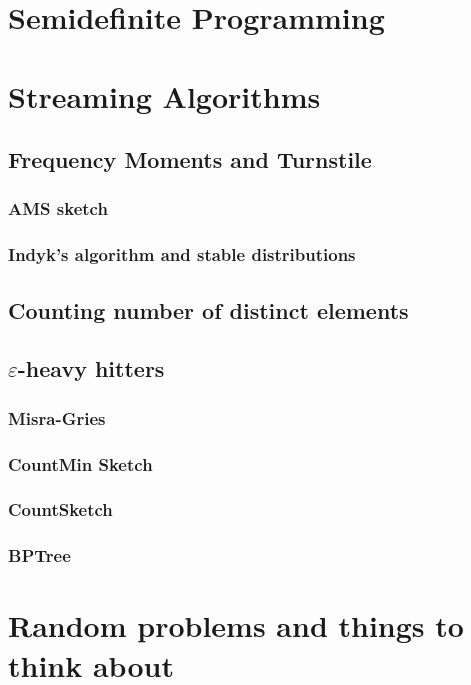 \documentclass[oneside,11pt]{scrbook}
\theoremstyle{plain}
\theoremstyle{definition}
\theoremstyle{remark}
\newcommand{\eps}{\varepsilon}
\begin{document}
\chapter{Semidefinite Programming}

\chapter{Streaming Algorithms}

\section{Frequency Moments and Turnstile}
\subsection{AMS sketch}

\subsection{Indyk's algorithm and stable distributions}

\section{Counting number of distinct elements}

\section{$\eps$-heavy hitters}

\subsection{Misra-Gries}

\subsection{CountMin Sketch}

\subsection{CountSketch}

\subsection{BPTree}

\chapter{Random problems and things to think about}
\end{document}
